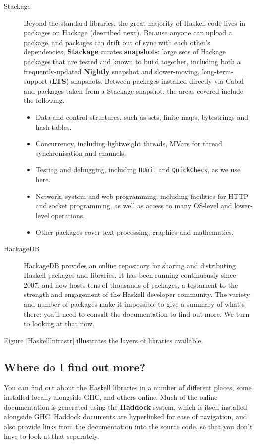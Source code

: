 \begin{description}
\item[Stackage]
Beyond the standard libraries, the great majority of Haskell code lives in packages on Hackage (described next). Because anyone can upload a package, and packages can drift out of sync with each other's dependencies, \href{https://www.stackage.org/}{\textbf{Stackage}} curates \textbf{snapshots}: large sets of Hackage packages that are tested and known to build together, including both a frequently-updated \textbf{Nightly} snapshot and slower-moving, long-term-support (\textbf{LTS}) snapshots. Between packages installed directly via Cabal and packages taken from a Stackage snapshot, the areas covered include the following.
\begin{itemize}
\item
Data and control structures, such as sets, finite maps, bytestrings and hash tables.
\item
Concurrency, including lightweight threads, MVars for thread synchronisation and channels.
\item
Testing and debugging, including \texttt{HUnit} and \texttt{QuickCheck}, as we use here.
\item
Network, system and web programming, including facilities for HTTP and socket programming, as well as access to many OS-level and lower-level operations.
\item
Other packages cover text processing, graphics and mathematics.
\end{itemize}
\item[HackageDB]
HackageDB provides an online repository for sharing and distributing Haskell packages and libraries. It has been running continuously since 2007, and now hosts tens of thousands of packages, a testament to the strength and engagement of the Haskell developer community. The variety and number of packages make it impossible to give a summary of what's there: you'll need to consult the documentation to find out more. We turn to looking at that now.
\end{description}
Figure \ref{HaskellInfrastr} illustrates the layers of libraries available.



\subsection*{Where do I find out more?}

You can find out about the Haskell libraries in a number of different places, some installed locally alongside GHC, and others online. Much of the online documentation is generated using the \textbf{Haddock} system, which is itself installed alongside GHC. Haddock documents are hyperlinked for ease of navigation, and also provide links from the documentation into the source code, so that you don't have to look at that separately.

